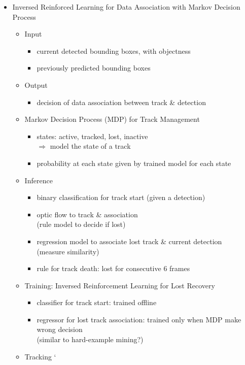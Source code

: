 \begin{itemize}
\item Inversed Reinforced Learning for Data Association with Markov Decision Process
	\begin{itemize}
	\item Input
		\begin{itemize}
		\item current detected bounding boxes, with objectness
		\item previously predicted bounding boxes
		\end{itemize}
	\item Output
		\begin{itemize}
		\item decision of data association between track \& detection
		\end{itemize}
	\item Markov Decision Process (MDP) for Track Management
		\begin{itemize}
		\item states: active, tracked, lost, inactive \\
		$\Rightarrow$ model the state of a track
		\item probability at each state given by trained model for each state
		\end{itemize}
	\item Inference
		\begin{itemize}
		\item binary classification for track start (given a detection)
		\item optic flow to track \& association \\
		(rule model to decide if lost)
		\item regression model to associate lost track \& current detection \\
		(measure similarity)
		\item rule for track death: lost for consecutive $6$ frames
		\end{itemize}
	\item Training: Inversed Reinforcement Learning for Lost Recovery
		\begin{itemize}
		\item classifier for track start: trained offline
		\item regressor for lost track association: trained only when MDP make wrong decision \\
		(similar to hard-example mining?)
		\end{itemize}
	\item Tracking
	`	\begin{itemize}

\end{itemize}
\end{itemize}
\end{itemize}
